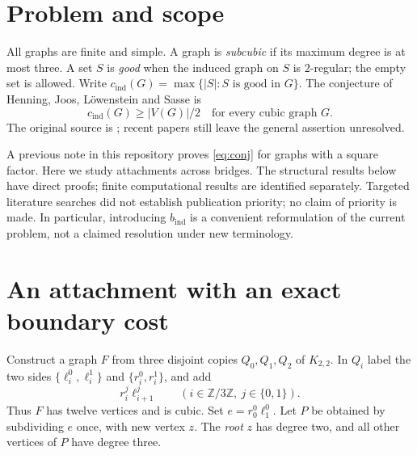 \documentclass[11pt]{article}
\newcommand{\cind}{c_{\mathrm{ind}}}
\newcommand{\bind}{b_{\mathrm{ind}}}
\begin{document}
\section{Problem and scope}
All graphs are finite and simple. A graph is \emph{subcubic} if its
maximum degree is at most three. A set $S$ is \emph{good} when the
induced graph on $S$ is $2$-regular; the empty set is allowed.
Write $\cind(G)=\max\{|S|:S\text{ is good in }G\}$.
The conjecture of Henning, Joos, L\"owenstein and Sasse is
\begin{equation}\label{eq:conj}
 \cind(G)\geq |V(G)|/2\quad\text{for every cubic graph }G.
\end{equation}
The original source is \cite{HJLS}; recent papers
\cite{KSS,RRT} still leave the general assertion unresolved.

A previous note in this repository proves \eqref{eq:conj} for graphs
with a square factor. Here we study attachments across bridges.
The structural results below have direct proofs; finite computational
results are identified separately.
Targeted literature searches did not establish publication priority;
no claim of priority is made. In particular, introducing $\bind$ is
a convenient reformulation of the current problem, not a claimed
resolution under new terminology.

\section{An attachment with an exact boundary cost}
Construct a graph $F$ from three disjoint copies $Q_0,Q_1,Q_2$ of
$K_{2,2}$. In $Q_i$ label the two sides
$\{\ell_i^0,\ell_i^1\}$ and $\{r_i^0,r_i^1\}$, and add
\[
 r_i^j\ell_{i+1}^j\qquad(i\in\mathbb Z/3\mathbb Z,\ j\in\{0,1\}).
\]
Thus $F$ has twelve vertices and is cubic. Set $e=r_0^0\ell_1^0$.
Let $P$ be obtained by subdividing $e$ once, with new vertex $z$.
The \emph{root} $z$ has degree two, and all other vertices of $P$
have degree three.
\end{document}
